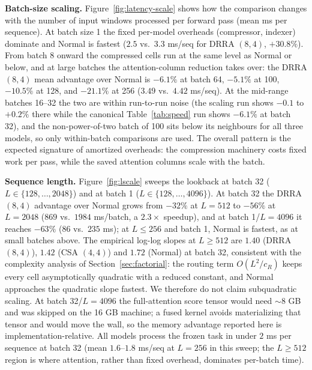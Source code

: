 \textbf{Batch-size scaling.} Figure~\ref{fig:latency-scale} shows how the
comparison changes with the number of input windows processed per forward
pass (mean ms per sequence). At batch size 1 the fixed per-model overheads
(compressor, indexer) dominate and Normal is fastest ($2.5$ vs.\ $3.3$
ms/seq for DRRA $(8,4)$, $+30.8\%$). From batch 8 onward the compressed cells
run at the same level as Normal or below, and at large batches the
attention-column reduction takes over: the DRRA $(8,4)$ mean advantage over
Normal is $-6.1\%$ at batch 64, $-5.1\%$ at 100, $-10.5\%$ at 128, and $-21.1\%$
at 256 ($3.49$ vs.\ $4.42$ ms/seq). At the mid-range batches 16--32 the two are
within run-to-run noise (the scaling run shows $-0.1$ to $+0.2\%$ there while
the canonical Table~\ref{tab:speed} run shows $-6.1\%$ at batch 32), and the
non-power-of-two batch of 100 sits below its neighbours for all three models,
so only within-batch comparisons are used. The overall pattern is the expected
signature of amortized overheads: the compression machinery costs fixed work
per pass, while the saved attention columns scale with the batch.

\textbf{Sequence length.} Figure~\ref{fig:lscale} sweeps the lookback at batch
32 ($L \in \{128, \dots, 2048\}$) and at batch 1 ($L \in \{128, \dots,
4096\}$). At batch 32 the DRRA $(8,4)$ advantage over Normal grows from $-32\%$
at $L{=}512$ to $-56\%$ at $L{=}2048$ ($869$ vs.\ $1984$ ms/batch, a
$2.3\times$ speedup), and at batch 1/$L{=}4096$ it reaches $-63\%$ ($86$ vs.\
$235$ ms); at $L \le 256$ and batch 1, Normal is fastest, as at small batches
above. The empirical log-log slopes at $L \ge 512$ are $1.40$ (DRRA $(8,4)$),
$1.42$ (CSA $(4,4)$) and $1.72$ (Normal) at batch 32, consistent with the
complexity analysis of Section~\ref{sec:factorial}: the routing term
$O(L^2/c_R)$ keeps every cell asymptotically quadratic with a reduced constant,
and Normal approaches the quadratic slope fastest. We therefore do not claim
subquadratic scaling. At batch 32/$L{=}4096$ the full-attention score tensor
would need ${\sim}8$ GB and was skipped on the 16 GB machine; a fused kernel
\citep{dao2022flashattention} avoids materializing that tensor and would move
the wall, so the memory advantage reported here is implementation-relative. All
models process the frozen task in under $2$ ms per sequence at batch 32 (mean
$1.6$--$1.8$ ms/seq at $L{=}256$ in this sweep; the $L \ge 512$ region is where
attention, rather than fixed overhead, dominates per-batch time).


